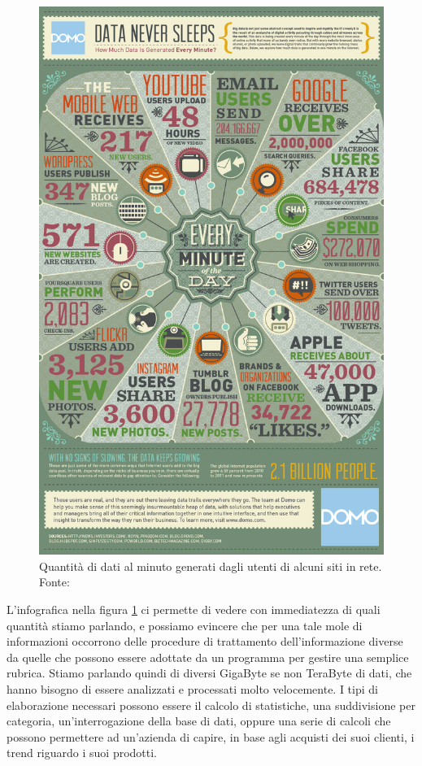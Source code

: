 \begin{figure}
	\centering
	\includegraphics[width=\textwidth]{img/Data-in-One-Minute.jpg}
	\caption{Quantità di dati al minuto generati dagli utenti di alcuni siti in rete. Fonte: \cite{data_per_minute}}
	\label{img:dpm}
\end{figure}
L'infografica nella figura \ref{img:dpm} ci permette di vedere con immediatezza di quali quantità stiamo parlando, e possiamo evincere che per una tale mole di informazioni occorrono delle procedure di trattamento dell'informazione diverse da quelle che possono essere adottate da un programma per gestire una semplice rubrica. Stiamo parlando quindi di diversi GigaByte se non TeraByte di dati, che hanno bisogno di essere analizzati e processati molto velocemente. I tipi di elaborazione necessari possono essere il calcolo di statistiche, una suddivisione per categoria, un'interrogazione della base di dati, oppure una serie di calcoli che possono permettere ad un'azienda di capire, in base agli acquisti dei suoi clienti, i trend riguardo i suoi prodotti. 

